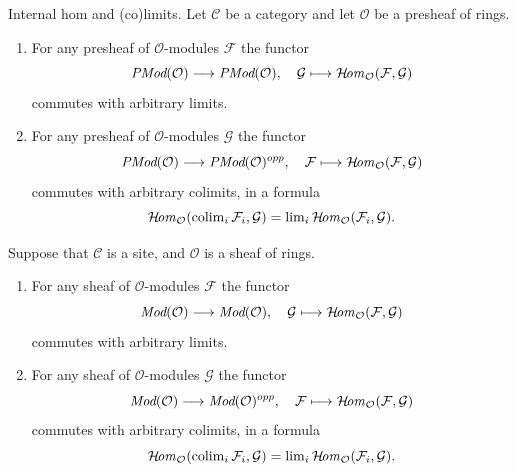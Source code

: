 \begin{lemma}
\label{lemma-internal-hom-commute-limits}
Internal hom and (co)limits.
Let $\mathcal{C}$ be a category and let $\mathcal{O}$ be a presheaf of rings.
\begin{enumerate}
\item For any presheaf of $\mathcal{O}$-modules $\mathcal{F}$ the functor
$$
\textit{PMod}(\mathcal{O}) \longrightarrow \textit{PMod}(\mathcal{O})
, \quad
\mathcal{G} \longmapsto \mathop{\mathcal{H}\!\mathit{om}}\nolimits_\mathcal{O}(\mathcal{F}, \mathcal{G})
$$
commutes with arbitrary limits.
\item For any presheaf of $\mathcal{O}$-modules $\mathcal{G}$ the functor
$$
\textit{PMod}(\mathcal{O}) \longrightarrow \textit{PMod}(\mathcal{O})^{opp}
, \quad
\mathcal{F} \longmapsto \mathop{\mathcal{H}\!\mathit{om}}\nolimits_\mathcal{O}(\mathcal{F}, \mathcal{G})
$$
commutes with arbitrary colimits, in a formula
$$
\mathop{\mathcal{H}\!\mathit{om}}\nolimits_\mathcal{O}(\mathop{\mathrm{colim}}\nolimits_i \mathcal{F}_i, \mathcal{G})
=
\mathop{\mathrm{lim}}\nolimits_i \mathop{\mathcal{H}\!\mathit{om}}\nolimits_\mathcal{O}(\mathcal{F}_i, \mathcal{G}).
$$
\end{enumerate}
Suppose that $\mathcal{C}$ is a site, and $\mathcal{O}$ is a sheaf of rings.
\begin{enumerate}
\item[(3)] For any sheaf of $\mathcal{O}$-modules $\mathcal{F}$ the functor
$$
\textit{Mod}(\mathcal{O}) \longrightarrow \textit{Mod}(\mathcal{O})
, \quad
\mathcal{G} \longmapsto \mathop{\mathcal{H}\!\mathit{om}}\nolimits_\mathcal{O}(\mathcal{F}, \mathcal{G})
$$
commutes with arbitrary limits.
\item[(4)] For any sheaf of $\mathcal{O}$-modules $\mathcal{G}$ the functor
$$
\textit{Mod}(\mathcal{O}) \longrightarrow \textit{Mod}(\mathcal{O})^{opp}
, \quad
\mathcal{F} \longmapsto \mathop{\mathcal{H}\!\mathit{om}}\nolimits_\mathcal{O}(\mathcal{F}, \mathcal{G})
$$
commutes with arbitrary colimits, in a formula
$$
\mathop{\mathcal{H}\!\mathit{om}}\nolimits_\mathcal{O}(\mathop{\mathrm{colim}}\nolimits_i \mathcal{F}_i, \mathcal{G})
=
\mathop{\mathrm{lim}}\nolimits_i \mathop{\mathcal{H}\!\mathit{om}}\nolimits_\mathcal{O}(\mathcal{F}_i, \mathcal{G}).
$$
\end{enumerate}
\end{lemma}

